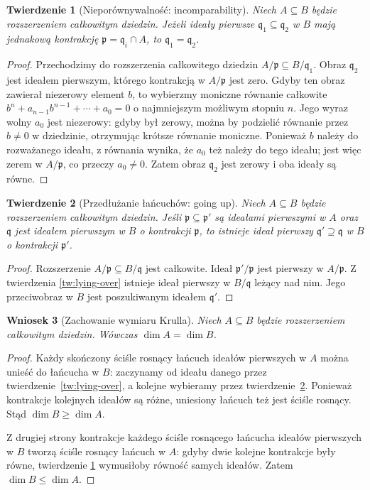 \documentclass[11pt,a4paper,openany]{report}
\numberwithin{equation}{section}
\theoremstyle{plain}
\newtheorem{twierdzenie}{Twierdzenie}[section]
\newtheorem{wniosek}[twierdzenie]{Wniosek}
\theoremstyle{definition}
\theoremstyle{remark}
\begin{document}
\begin{twierdzenie}[Nieporównywalność: incomparability]
\label{tw:incomparability}
Niech $A\subseteq B$ będzie rozszerzeniem całkowitym
dziedzin. Jeżeli ideały pierwsze $\mathfrak q_1
\subseteq\mathfrak q_2$ w $B$ mają jednakową
kontrakcję $\mathfrak p=\mathfrak q_i\cap A$,
to $\mathfrak q_1=\mathfrak q_2$.
\end{twierdzenie}
\begin{proof}
Przechodzimy do rozszerzenia całkowitego
dziedzin $A/\mathfrak p\subseteq B/\mathfrak q_1$.
Obraz $\mathfrak q_2$ jest ideałem pierwszym,
którego kontrakcją w $A/\mathfrak p$ jest zero.
Gdyby ten obraz zawierał niezerowy element $b$,
to wybierzmy moniczne równanie całkowite
$b^n+a_{n-1}b^{n-1}+\cdots+a_0=0$ o
najmniejszym możliwym stopniu $n$. Jego wyraz
wolny $a_0$ jest niezerowy: gdyby był zerowy,
można by podzielić równanie przez $b\ne0$ w
dziedzinie, otrzymując krótsze równanie moniczne.
Ponieważ $b$ należy do rozważanego ideału,
z równania wynika, że $a_0$ też należy do
tego ideału; jest więc zerem w $A/\mathfrak p$,
co przeczy $a_0\ne0$. Zatem obraz
$\mathfrak q_2$ jest zerowy i oba ideały są równe.
\end{proof}

\begin{twierdzenie}[Przedłużanie łańcuchów: going up]
\label{tw:going-up}
Niech $A\subseteq B$ będzie rozszerzeniem całkowitym
dziedzin. Jeśli $\mathfrak p\subseteq\mathfrak p'$
są ideałami pierwszymi w $A$ oraz $\mathfrak q$
jest ideałem pierwszym w $B$ o kontrakcji
$\mathfrak p$, to istnieje ideał pierwszy
$\mathfrak q'\supseteq\mathfrak q$ w $B$ o
kontrakcji $\mathfrak p'$.
\end{twierdzenie}
\begin{proof}
Rozszerzenie $A/\mathfrak p\subseteq B/\mathfrak q$
jest całkowite. Ideał $\mathfrak p'/\mathfrak p$
jest pierwszy w $A/\mathfrak p$. Z twierdzenia
\ref{tw:lying-over} istnieje ideał pierwszy w
$B/\mathfrak q$ leżący nad nim. Jego przeciwobraz
w $B$ jest poszukiwanym ideałem $\mathfrak q'$.
\end{proof}

\begin{wniosek}[Zachowanie wymiaru Krulla]
\label{wn:dim-integral}
Niech $A\subseteq B$ będzie rozszerzeniem całkowitym
dziedzin. Wówczas $\dim A=\dim B$.
\end{wniosek}
\begin{proof}
Każdy skończony ściśle rosnący łańcuch
ideałów pierwszych w $A$ można unieść do
łańcucha w $B$: zaczynamy od ideału danego
przez twierdzenie~\ref{tw:lying-over}, a kolejne
wybieramy przez twierdzenie~\ref{tw:going-up}.
Ponieważ kontrakcje kolejnych ideałów są różne,
uniesiony łańcuch też jest ściśle rosnący.
Stąd $\dim B\ge\dim A$.

Z drugiej strony kontrakcje każdego ściśle
rosnącego łańcucha ideałów pierwszych w $B$
tworzą ściśle rosnący łańcuch w $A$: gdyby dwie
kolejne kontrakcje były równe, twierdzenie
\ref{tw:incomparability} wymusiłoby równość
samych ideałów. Zatem $\dim B\le\dim A$.
\end{proof}
\end{document}
